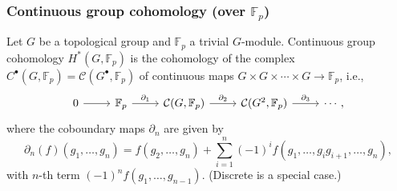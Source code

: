 \documentclass{beamer}
\newcommand*\F{\mathbb{F}}
\DeclareMathOperator{\im}{im}
\DeclareMathOperator{\Hom}{Hom} %
\newcommand*\Cont{\mathcal{C}}
\begin{document}






\begin{frame}[fragile]
  \frametitle{Continuous group cohomology (over $\F_p$)}

  Let $G$ be a topological group and $\F_p$ a trivial $G$-module. Continuous group cohomology $H^{*}(G,\F_{p})$ is the cohomology of the complex $C^{\bullet}(G,\F_{p}) = \Cont(G^{\bullet},\F_{p})$ of continuous maps $G \times G \times \dotsb \times G \to \F_{p}$, i.e.,
  \[
    \begin{tikzcd}
      0 \ar[r] & \F_{p} \ar[r,"\partial_{1}"] & \Cont(G,\F_{p}) \ar[r,"\partial_{2}"] & \Cont(G^{2},\F_{p}) \ar[r,"\partial_{3}"] & \cdots,
    \end{tikzcd}
  \]
  where the coboundary maps $\partial_{n}$ are given by
  \[
    \partial_{n}(f)(g_{1},\dotsc,g_{n}) = f(g_{2},\dotsc,g_{n}) + \sum_{i=1}^{n} (-1)^{i}f(g_{1},\dotsc,g_{i}g_{i+1},\dotsc,g_{n}),
  \]
  with $n$-th term $(-1)^{n}f(g_{1},\dotsc,g_{n-1})$. \pause (Discrete is a special case.)
\end{frame}
\end{document}
